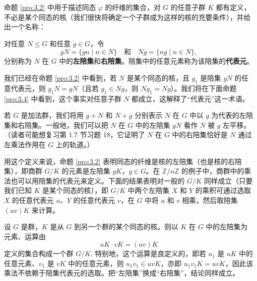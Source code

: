 命题 \ref{pro:3.2} 中用于描述同态 \(\varphi\) 的纤维的集合，对 \(G\) 的任意子群 \(K\) 都有定义，不必是某个同态的核（我们很快将确定一个子群成为这样的核的充要条件），并给出一个名称：

\begin{definition}
对任意 \(N \leq G\) 和任意 \(g \in G\)，令
\[
gN = \{gn \mid n \in N\} \quad \text{和} \quad Ng = \{ng \mid n \in N\},
\]
分别称为 \(N\) 在 \(G\) 中的\textbf{左陪集}和\textbf{右陪集}。陪集中的任意元素称为该陪集的\textbf{代表元}。
\end{definition}

我们已经在命题 \ref{pro:3.2} 中看到，若 \(N\) 是某个同态的核，且 \(g_1\) 是陪集 \(gN\) 的任意代表元，则 \(g_1N = gN\)（且若 \(g_1 \in Ng\)，则 \(Ng_1 = Ng\)）。我们将在下面命题 \ref{pro:3.4} 中看到，这个事实对任意子群 \(N\) 都成立，这解释了“代表元”这一术语。

若 \(G\) 是加法群，我们将用 \(g + N\) 和 \(N + g\) 分别表示 \(N\) 在 \(G\) 中以 \(g\) 为代表的左陪集和右陪集。一般地，我们可以把 \(N\) 在 \(G\) 中的左陪集 \(gN\) 看作 \(N\) 被 \(g\) 左平移。（读者可能想复习第 1.7 节习题 18，它证明了 \(N\) 在 \(G\) 中的右陪集恰好是 \(N\) 通过左乘法作用在 \(G\) 上的轨道。）

用这个定义来说，命题 \ref{pro:3.2} 表明同态的纤维是核的左陪集（也是核的右陪集），即商群 \(G/K\) 的元素是左陪集 \(gK\)，\(g \in G\)。在 \(\mathbb{Z}/n\mathbb{Z}\) 的例子中，商群中的乘法也可以用陪集的代表元来定义。下面的结果表明对一般的 \(G/K\) 同样成立（只要我们已知 \(K\) 是某个同态的核），即 \(G/K\) 中两个左陪集 \(X\) 和 \(Y\) 的乘积可通过选取 \(X\) 的任意代表元 \(u\)、\(Y\) 的任意代表元 \(v\)，在 \(G\) 中将 \(u\) 和 \(v\) 相乘，然后取陪集 \((uv)K\) 来计算。

\begin{theorem}\label{thm:3.3}
设 \(G\) 是群，\(K\) 是从 \(G\) 到另一个群的某个同态的核。则以 \(K\) 在 \(G\) 中的左陪集为元素、运算由
\[
uK \cdot vK = (uv)K
\]
定义的集合构成一个群 \(G/K\). 特别地，这个运算是良定义的，即若 \(u_1\) 是 \(uK\) 中的任意元素、\(v_1\) 是 \(vK\) 中的任意元素，则 \(u_1 v_1 \in uvK\)，亦即 \(u_1 v_1 K = uvK\)，因此该乘法不依赖于陪集代表元的选取。把“左陪集”换成“右陪集”，结论同样成立。
\end{theorem}

